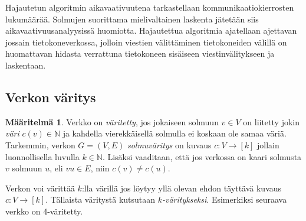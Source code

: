 \documentclass[finnish]{tktltiki2}
\theoremstyle{definition}
\newtheorem{maar}[lau]{Määritelmä}
\theoremstyle{remark}
\newcommand{\nat}{\mathbb{N}}
\newcommand{\from}{\colon}
\begin{document}
Hajautetun algoritmin aikavaativuutena tarkastellaan kommunikaatiokierrosten
lukumäärää. Solmujen suorittama mielivaltainen laskenta jä\-te\-tään siis
aikavaativuusanalyysissä huomiotta. Hajautettua algoritmia ajatellaan ajettavan
jossain tietokoneverkossa, jolloin viestien välittäminen tietokoneiden välillä
on huomattavan hidasta verrattuna tietokoneen sisäiseen viestinvälitykseen ja
laskentaan.

\subsection{Verkon väritys}

\begin{maar}
    Verkko on \emph{väritetty}, jos jokaiseen solmuun $v \in V$ on liitetty
    jokin \emph{väri} $c(v) \in \nat$ ja kahdella vierekkäisellä solmulla ei
    koskaan ole samaa väriä.  Tarkemmin, verkon $G = (V,E)$ \emph{solmuväritys}
    on kuvaus $c \from V \to [k]$ jollain luonnollisella luvulla $k \in \nat$.
    Lisäksi vaaditaan, että jos verkossa on kaari solmusta $v$ solmuun $u$, eli
    $vu \in E$, niin $c(v) \neq c(u)$.
\end{maar}

Verkon voi värittää $k$:lla värillä jos löytyy yllä olevan ehdon täyttävä
kuvaus $c \from V \to [k]$. Tällaista väritystä kutsutaan
\emph{$k$-väritykseksi}. Esimerkiksi seuraava verkko on 4-väritetty.



\begin{center}
\end{center}
\end{document}
